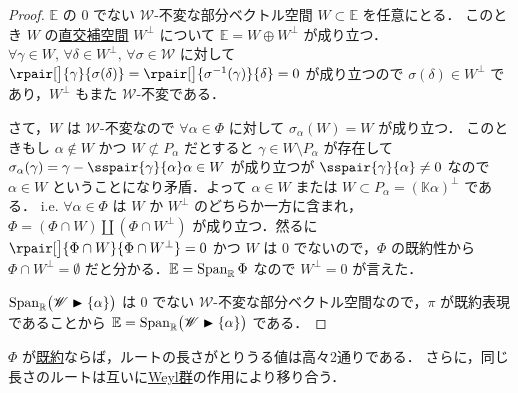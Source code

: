 \documentclass[rep_main]{subfiles}
\begin{document}
\begin{proof}
	$\mathbb{E}$ の $0$ でない $\mathscr{W}$-不変な部分ベクトル空間 $W \subset \mathbb{E}$ を任意にとる．
	このとき $W$ の\hyperref[def:radical-bilinear]{直交補空間} $W^\perp$ について $\mathbb{E} = W \oplus W^\perp$ が成り立つ．
	$\forall \gamma \in W,\, \forall \delta \in W^\perp,\, \forall \sigma \in \mathscr{W}$ に対して $\rpair[\big]{\gamma}{\sigma (\delta)} =  \rpair[\big]{\sigma^{-1}(\gamma)}{\delta} = 0$ が成り立つので $\sigma(\delta) \in W^\perp$ であり，$W^\perp$ もまた $\mathscr{W}$-不変である．
	
	さて，$W$ は $\mathscr{W}$-不変なので $\forall \alpha \in \Phi$ に対して $\sigma_\alpha (W) = W$ が成り立つ．
	このときもし $\alpha \notin W$ かつ $W \not\subset P_\alpha$ だとすると $\gamma \in W \setminus P_\alpha$ が存在して $\sigma_\alpha(\gamma) = \gamma - \sspair{\gamma}{\alpha}\alpha \in W$ が成り立つが $\sspair{\gamma}{\alpha} \neq 0$ なので $\alpha \in W$ ということになり矛盾．よって $\alpha \in W$ または $W \subset P_\alpha = (\mathbb{K}\alpha)^\perp$ である．
	i.e. $\forall \alpha \in \Phi$ は $W$ か $W^\perp$ のどちらか一方に含まれ，$\Phi = (\Phi \cap W) \amalg (\Phi \cap W^\perp)$ が成り立つ．然るに $\rpair[\big]{\Phi \cap W}{\Phi \cap W^\perp} = 0$ かつ $W$ は $0$ でないので，$\Phi$ の既約性から $\Phi \cap W^\perp = \emptyset$ だと分かる．$\mathbb{E} = \operatorname{Span}_{\mathbb{R}}\Phi$ なので $W^\perp = 0$ が言えた．

	$\operatorname{Span}_{\mathbb{R}} \bigl(\mathscr{W} \blacktriangleright \{\alpha\}\bigr)$ は $0$ でない $\mathscr{W}$-不変な部分ベクトル空間なので，$\pi$ が既約表現であることから $\mathbb{E} = \operatorname{Span}_{\mathbb{R}} \bigl(\mathscr{W} \blacktriangleright \{\alpha\}\bigr)$ である．
\end{proof}


\begin{mylem}[label=lem:irr-root-C]{}
	$\Phi$ が\hyperref[def:irr-root]{既約}ならば，ルートの長さがとりうる値は高々2通りである．
	さらに，同じ長さのルートは互いに\hyperref[def:Weylgroup]{Weyl群}の作用により移り合う．
\end{mylem}
\end{document}
